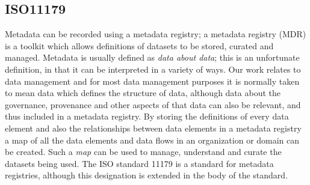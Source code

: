 \documentclass[runningheads]{llncs}
\begin{document}
	
	
	\subsection{ISO11179}
		Metadata can be recorded using a metadata registry; a metadata registry (MDR) is a toolkit which allows definitions of datasets to be stored, curated and managed. Metadata is usually defined as \emph{data about data}; this is an unfortunate definition, in that it can be interpreted in a variety of ways. Our work relates to data management and for most data management purposes it is normally taken to mean data which defines the structure of data, although data about the governance, provenance and other aspects of that data can also be relevant, and thus included in a metadata registry. By storing the definitions of every data element and also the relationships between data elements in a metadata registry a map of all the data elements and data flows in an organization or domain can be created. Such a \emph{map} can be used to manage, understand and curate the datasets being used. The ISO standard 11179 is a standard for metadata registries, although this designation is extended in the body of the standard.
	
\end{document}
